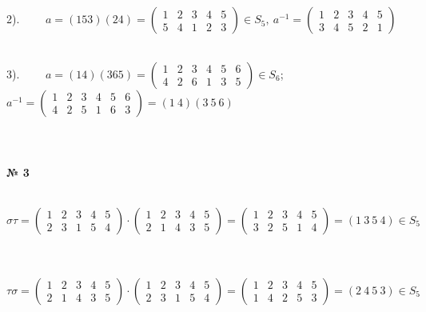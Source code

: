 \documentclass[a4paper, 12pt]{article}
\begin{document}
    \\
    \\
    \par 2). \ \ \ \ $a = (1 5 3)(2 4) = \begin{pmatrix}1 & 2 & 3 & 4 & 5\\5 &4 &1 & 2& 3\end{pmatrix} \in S_5, \ a^{-1} = \begin{pmatrix}1 & 2 & 3 & 4 & 5\\ 3 & 4 & 5 & 2 & 1\end{pmatrix}$
    \\
    \\
    \par 3). \ \ \ \ $a = (1 4)(3 6 5) = \begin{pmatrix}1 & 2 & 3 & 4 & 5 & 6\\4 &2 &6 &1 & 3&5 \end{pmatrix} \in S_6$; $a^{-1} = \begin{pmatrix}1 & 2 & 3 & 4 & 5 & 6\\4 & 2 & 5 & 1 & 6 & 3 \end{pmatrix} = (1 \ 4)(3 \ 5 \ 6)$
    \\\\\\
    \\ \textbf{№ 3}
    \\
    \par \ \ \ \ $\sigma \tau =  \begin{pmatrix}1 & 2 & 3 & 4 & 5\\2 & 3 & 1 & 5 & 4 \end{pmatrix} \cdot \begin{pmatrix}1 & 2 & 3 & 4 & 5\\2 & 1 & 4 & 3 & 5 \end{pmatrix} = \begin{pmatrix}1 & 2 & 3 & 4 & 5\\3 & 2 & 5 & 1 & 4 \end{pmatrix} = (1 \ 3 \ 5 \ 4) \in S_5$
    \\\\
    \par \ \ \ \ $\tau \sigma =  \begin{pmatrix}1 & 2 & 3 & 4 & 5\\2 & 1 & 4 & 3 & 5 \end{pmatrix} \cdot \begin{pmatrix}1 & 2 & 3 & 4 & 5\\2 & 3 & 1 & 5 & 4 \end{pmatrix} = \begin{pmatrix}1 & 2 & 3 & 4 & 5\\1 & 4 & 2 & 5 & 3 \end{pmatrix} = (2 \ 4 \ 5 \ 3) \in S_5$
\end{document}
